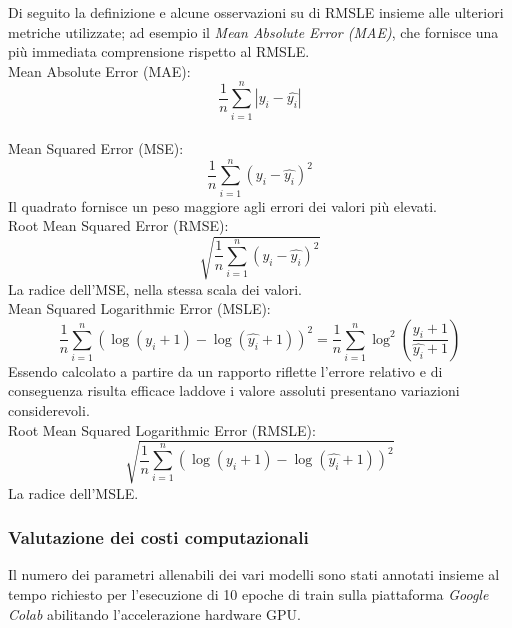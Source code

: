 Di seguito la definizione e alcune osservazioni su di RMSLE insieme alle
ulteriori metriche utilizzate; ad esempio il \textit{Mean Absolute Error (MAE)},
che fornisce una più immediata comprensione rispetto al RMSLE. \\
Mean Absolute Error (MAE):
\begin{equation}
    \frac{1}{n} \sum_{i=1}^{n} | y_i - \hat{y_i} |
\end{equation}
\\
Mean Squared Error (MSE):
\begin{equation}
    \frac{1}{n} \sum_{i=1}^{n} ( y_i - \hat{y_i} )^2
\end{equation}
Il quadrato fornisce un peso maggiore agli errori dei valori più elevati\cite{rmse-or-mae}.
\\
Root Mean Squared Error (RMSE):
\begin{equation}
    \sqrt{ \frac{1}{n} \sum_{i=1}^{n} ( y_i - \hat{y_i} )^2}
\end{equation}
La radice dell'MSE, nella stessa scala dei valori.
\\
Mean Squared Logarithmic Error (MSLE):
\begin{equation}
    \frac{1}{n}
        \sum_{i=1}^{n}
            ( \log(y_i+1) - \log(\hat{y_i}+1) )^2
    =
    \frac{1}{n}
        \sum_{i=1}^{n}
            \log^2(\frac{y_i+1}{\hat{y_i}+1})
\end{equation}
Essendo calcolato a partire da un rapporto riflette l'errore relativo e di
conseguenza risulta efficace laddove i valore assoluti presentano variazioni considerevoli.
\\
Root Mean Squared Logarithmic Error (RMSLE):
\begin{equation}
    \sqrt{ 
        \frac{1}{n}
            \sum_{i=1}^{n}
                ( \log(y_i+1) - \log(\hat{y_i}+1) )^2
    }
\end{equation}
La radice dell'MSLE.


\subsubsection{Valutazione dei costi computazionali}

Il numero dei parametri allenabili dei vari modelli sono stati annotati insieme
al tempo richiesto per l'esecuzione di 10 epoche di train sulla piattaforma
\textit{Google Colab} abilitando l'accelerazione hardware GPU.

